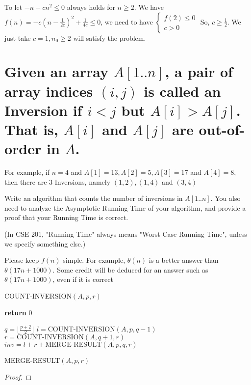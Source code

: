 \documentclass[a4paper]{article}
\begin{document}
  To let $-n-cn^2\leq 0$ always holds for $n\geq 2$. We have $f(n)= -c(n-\frac 1{2c})^2+\frac1{4c}\leq0$, we need to have 
  $\begin{cases}
    f(2) \leq 0\\
    c>0
    \end{cases}$
  So, $c\geq \frac 12$. We just take $c=1,n_0\geq 2$ will satisfy the problem.
\section{Given an array $A[1..n]$, a pair of array indices $(i, j)$ is called an Inversion if $i < j$ but $A[i] > A[j]$. That is, $A[i]$ and $A[j]$ are out-of-order in $A$.}

For example, if $n=4$ and $A[1]=13, A[2]=5, A[3]=17$ and $A[4]=8$, then there are 3 Inversions, namely $(1,2),(1,4)$ and $(3,4)$

Write an algorithm that counts the number of inversions in $A[1 . . n]$. You also need to analyze the Asymptotic Running Time of your algorithm, and provide a proof that your Running Time is correct.

(In CSE 201, "Running Time" always means "Worst Case Running Time", unless we specify something else.)

Please keep $f(n)$ simple. For example, $\theta(n)$ is a better answer than $\theta(17 n+1000)$. Some credit will be deduced for an answer such as $\theta(17 n+1000)$, even if it is correct

\begin{algorithm}
  \caption{COUNT-INVERSION$(A,p,r)$}\label{alg:cap3}
  \begin{algorithmic}[1] 
  \State \textbf{return} 0
  \EndIf
    
  \State $q =\lfloor\frac{p+2}2\rfloor $
  \State $l =\text{COUNT-INVERSION}(A,p, q-1)$
  \State $r = \text{COUNT-INVERSION}(A,q+1,r)$
  \State $inv =l+r+ \text{MERGE-RESULT}(A,p,q,r)$

  \end{algorithmic}
  \end{algorithm}
  \begin{algorithm}
    \caption{MERGE-RESULT$(A,p,r)$}\label{alg:cap4}
    \begin{algorithmic}[1] 

  
    \end{algorithmic}
    \end{algorithm}
\begin{proof}

\end{proof}
\end{document}
